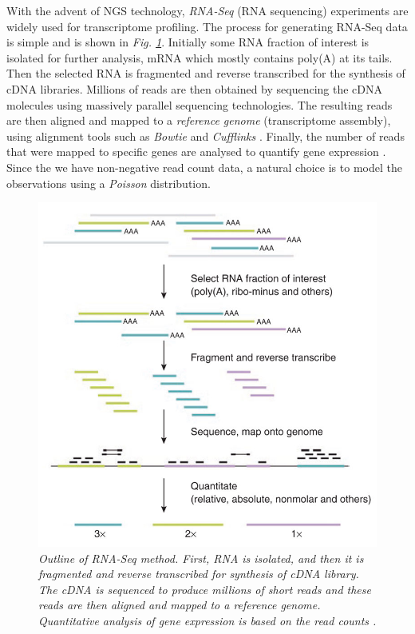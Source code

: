 With the advent of NGS technology, \emph{RNA-Seq} (RNA sequencing) \citep{Wang2009} experiments are widely used for transcriptome profiling. The process for generating RNA-Seq data is simple and is shown in \emph{Fig. \ref{rnaSeq-pic}}. Initially some RNA fraction of interest is isolated for further analysis, \eg mRNA which mostly contains poly(A) at its tails. Then the selected RNA is fragmented and reverse transcribed for the synthesis of cDNA libraries. Millions of reads are then obtained by sequencing the cDNA molecules using massively parallel sequencing technologies. The resulting reads are then aligned and mapped to a \emph{reference genome} (\ie transcriptome assembly), using alignment tools such as \emph{Bowtie} \citep{Langmead2009} and \emph{Cufflinks} \citep{Trapnell2010}. Finally, the number of reads that were mapped to specific genes are analysed to quantify gene expression \citep{Pepke2009}. Since the we have non-negative read count data, a natural choice is to model the observations using a \emph{Poisson} distribution.
\begin{figure}[!ht]
\begin{center}
 \includegraphics[scale = 0.45]{images/rna-seq}
\caption{\emph{Outline of RNA-Seq method. First, RNA is isolated, and then it is fragmented and reverse transcribed for synthesis of cDNA library. The cDNA is sequenced to produce millions of short reads and these reads are then aligned and mapped to a reference genome. Quantitative analysis of gene expression is based on the read counts \citep{Pepke2009}.}}
\label{rnaSeq-pic}
\end{center}
\end{figure}

